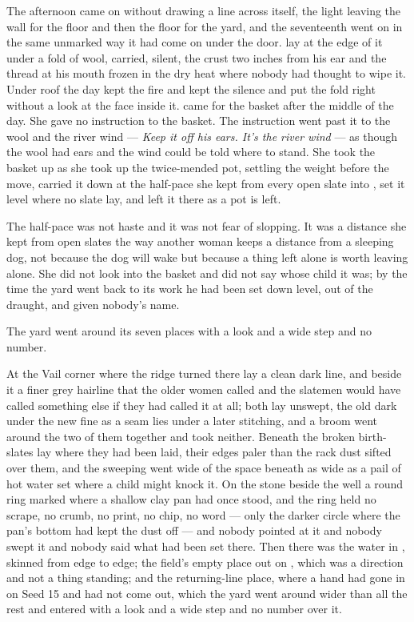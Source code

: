 The afternoon came on without drawing a line across itself, the light leaving the wall for the floor and then the floor for the yard, and the seventeenth went on in the same unmarked way it had come on under the door.  lay at the edge of it under a fold of wool, carried, silent, the crust two inches from his ear and the thread at his mouth frozen in the dry heat where nobody had thought to wipe it. Under  roof the day kept the fire and kept the silence and put the fold right without a look at the face inside it.  came for the basket after the middle of the day. She gave no instruction to the basket. The instruction went past it to the wool and the river wind --- \emph{Keep it off his ears. It's the river wind} --- as though the wool had ears and the wind could be told where to stand. She took the basket up as she took up the twice-mended pot, settling the weight before the move, carried it down at the half-pace she kept from every open slate into , set it level where no slate lay, and left it there as a pot is left.

The half-pace was not haste and it was not fear of slopping. It was a distance she kept from open slates the way another woman keeps a distance from a sleeping dog, not because the dog will wake but because a thing left alone is worth leaving alone. She did not look into the basket and did not say whose child it was; by the time the yard went back to its work he had been set down level, out of the draught, and given nobody's name.

The yard went around its seven places with a look and a wide step and no number.

At the Vail corner where the  ridge turned there lay a clean dark line, and beside it a finer grey hairline that the older women called  and the slatemen would have called something else if they had called it at all; both lay unswept, the old dark under the new fine as a seam lies under a later stitching, and a broom went around the two of them together and took neither. Beneath  the broken birth-slates lay where they had been laid, their edges paler than the rack dust sifted over them, and the sweeping went wide of the space beneath as wide as a pail of hot water set where a child might knock it. On the stone beside the well a round ring marked where a shallow clay pan had once stood, and the ring held no scrape, no crumb, no print, no chip, no word --- only the darker circle where the pan's bottom had kept the dust off --- and nobody pointed at it and nobody swept it and nobody said what had been set there. Then there was the water in , skinned from edge to edge; the field's empty place out on , which was a direction and not a thing standing; and the returning-line place, where a hand had gone in on Seed 15 and had not come out, which the yard went around wider than all the rest and entered with a look and a wide step and no number over it.

